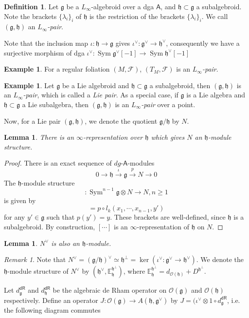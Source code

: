 \documentclass[12pt]{amsart}
\newtheorem{lem}[thm]{Lemma}
\theoremstyle{definition}
\newtheorem{example}[thm]{Example}
\newtheorem{defn}[thm]{Definition}
\theoremstyle{remark}
\newtheorem{rem}[thm]{Remark}
\numberwithin{equation}{section}
\newcommand{\CF}{{\mathcal F}}
\newcommand{\CO}{{\mathcal O}}
\newcommand{\1}{{\mathbb{1}}}
\newcommand{\g}{\mathfrak{g}}
\newcommand{\h}{\mathfrak{h}}
\newcommand{\dr}{\mathsf{dR}}
\newcommand{\sym}{\operatorname{Sym}}
\begin{document}
\begin{defn}
Let $\g$ be a $L_{\infty}$-algebroid over a dga $\mathsf{A}$, and $\h \subset \g$ a subalgebroid. Note the brackets $\{\lambda_i\}_i$ of $\h$ is the restriction of the brackets $\{\lambda_i\}_i$. We call $(\g, \h)$ an {\it $L_{\infty}$-pair}.
\end{defn}

Note that the inclusion map $\iota: \h \to \g$ gives $\iota^{\vee}:\g^{\vee} \to \h^{\vee}$, consequently we have a surjective morphism of dga $\iota^{\vee}:\sym \g^{\vee}[-1] \to \sym \h^{\vee}[-1]$
\begin{example}
    For a regular foliation $(M, \CF)$, $(T_M, \CF)$ is an  {\it $L_{\infty}$-pair}.
\end{example}
\begin{example}
    Let $\g$ be a Lie algebroid and $\h \subset \g$ a subalgebroid, then  $(\g, \h)$ is an {\it $L_{\infty}$-pair}, which is called a {\it Lie pair}. As a special case, if $\g$ is a Lie algebra and $\h \subset \g$ a Lie subalgebra, then 
    $(\g, \h)$ is an {\it $L_{\infty}$-pair} over a point. 
\end{example}


Now, for a Lie pair $(\g, \h)$, we denote the quotient $\g / \h$ by $N$.

\begin{lem}
There is an $\infty$-representation over $\h$ which gives $N$ an $\h$-module structure.
\end{lem}


\begin{proof}
There is an exact sequence of $dg$-$\mathsf{A}$-modules
\begin{equation*}
    0\longrightarrow \h \stackrel{\iota}{\longrightarrow} \g \stackrel{p}{\longrightarrow} N \to 0
\end{equation*}
The $\h$-module structure 
\begin{equation*}
    [x_1, \cdots, x_{n-1}, y]: \sym^{n-1}\g \otimes N \to N, n \ge 1
\end{equation*}is given by
\begin{equation*}
    [x_1, \cdots, x_{n-1}, y] = p \circ l_k(x_1, \cdots, x_{n-1}, y')
\end{equation*}
for any $y' \in \g$ such that $p(y') = y$. These brackets are well-defined, since $\h$ is a subalgebroid. By construction, $[\cdots]$ is an $\infty$-representation of $\h$ on $N$.
\end{proof}
\begin{lem}
$N^{\vee}$ is also an $\h$-module.
\end{lem}
\begin{rem}
    Note that $N^{\vee} = (\g / \h)^{\vee} \simeq \h^{\perp} = \ker (\iota^{\vee}:\g^{\vee} \to \h^{\vee})$. We denote the $\h$-module structure of $N^{\vee}$ by $(\h^{\vee}, \mathbb{E}_{\h}^{\h^{\perp}})$, where $\mathbb{E}_{\h}^{\h^{\perp}} = d_{\CO(\h)} + D^{\h^{\perp}}$.
\end{rem}
Let $d^{\dr}_{\g}$ and $d^{\dr}_{\h}$ be the algebraic de Rham operator on $\CO(\g)$ and $\CO(\h)$ respectively.
Define an operator $J: \CO(\g) \to A(\h, \g^{\vee})$ by $J = (\iota^{\vee} \otimes 1 \circ d^{\dr}_{\g}$, i.e. the following diagram commutes
\end{document}
